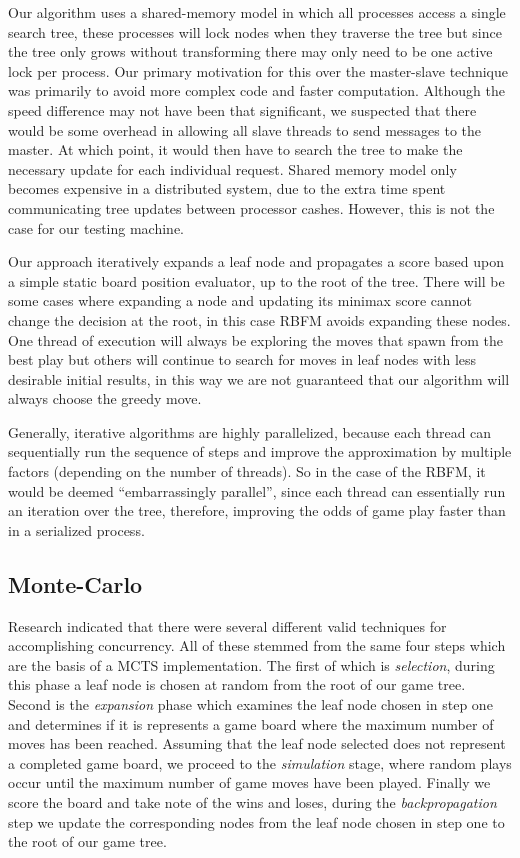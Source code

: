 \documentclass[conference]{IEEEtran}
\begin{document}
Our algorithm uses a shared-memory model in which all processes access a single search tree, these processes will lock nodes when they traverse the tree but since the tree only grows without transforming there may only need to be one active lock per process. Our primary motivation for this over the master-slave technique was primarily to avoid more complex code and faster computation. Although the speed difference may not have been that significant, we suspected that there would be some overhead in allowing all slave threads to send messages to the master. At which point, it would then have to search the tree to make the necessary update for each individual request. Shared memory model only becomes expensive in a distributed system, due to the extra time spent communicating tree updates between processor cashes. However, this is not the case for our testing machine.\par
Our approach iteratively expands a leaf node and propagates a score based upon a simple static board position evaluator, up to the root of the tree. There will be some cases where expanding a node and updating its minimax score cannot change the decision at the root, in this case RBFM avoids expanding these nodes. One thread of execution will always be exploring the moves that spawn from the best play but others will continue to search for moves in leaf nodes with less desirable initial results, in this way we are not guaranteed that our algorithm will always choose the greedy move.\par
Generally, iterative algorithms are highly parallelized, because each thread can sequentially run the sequence of steps and improve the approximation by multiple factors (depending on the number of threads). So in the case of the RBFM, it would be deemed “embarrassingly parallel”, since each thread can essentially run an iteration over the tree, therefore, improving the odds of game play faster than in a serialized process.

\subsection{Monte-Carlo}
Research indicated that there were several different valid techniques for accomplishing concurrency. All of these stemmed from the same four steps which are the basis of a MCTS implementation. The first of which is \textit{selection}, during this phase a leaf node is chosen at random from the root of our game tree. Second is the \textit{expansion} phase which examines the leaf node chosen in step one and determines if it is represents a game board where the maximum number of moves has been reached. Assuming that the leaf node selected does not represent a completed game board, we proceed to the \textit{simulation} stage, where random plays occur until the maximum number of game moves have been played. Finally we score the board and take note of the wins and loses, during the \textit{backpropagation} step we update the corresponding nodes from the leaf node chosen in step one to the root of our game tree.
\end{document}
